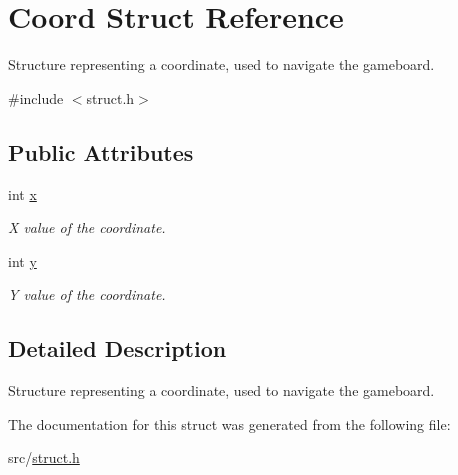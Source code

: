 \hypertarget{struct_coord}{}\section{Coord Struct Reference}
\label{struct_coord}


Structure representing a coordinate, used to navigate the gameboard.  




{\ttfamily \#include $<$struct.\+h$>$}

\subsection*{Public Attributes}
\begin{DoxyCompactItemize}
\item 
\mbox{\label{struct_coord_a696eaa744360fc791d0e3b331c549dbe}} 
int \hyperlink{struct_coord_a696eaa744360fc791d0e3b331c549dbe}{x}
\begin{DoxyCompactList}\small\item\em X value of the coordinate. \end{DoxyCompactList}\item 
\mbox{\label{struct_coord_a214166cca70cef7dda9201689c3e81ab}} 
int \hyperlink{struct_coord_a214166cca70cef7dda9201689c3e81ab}{y}
\begin{DoxyCompactList}\small\item\em Y value of the coordinate. \end{DoxyCompactList}\end{DoxyCompactItemize}


\subsection{Detailed Description}
Structure representing a coordinate, used to navigate the gameboard. 

The documentation for this struct was generated from the following file\+:\begin{DoxyCompactItemize}
\item 
src/\hyperlink{struct_8h}{struct.\+h}\end{DoxyCompactItemize}
